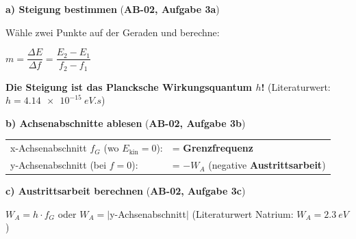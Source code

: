 \documentclass[11pt,a4paper]{article}
\begin{document}

\begin{tcolorbox}[schrittbox={Schritt 3: Auswertung (15 min)}]
\textbf{a) Steigung bestimmen} (\textbf{AB-02, Aufgabe 3a})

Wähle zwei Punkte auf der Geraden und berechne:
\begin{center}
$m = \dfrac{\Delta E}{\Delta f} = \dfrac{E_2 - E_1}{f_2 - f_1}$
\end{center}

\textbf{Die Steigung ist das Plancksche Wirkungsquantum $h$!} (Literaturwert: $h = \SI{4,14e-15}{eV.s}$)

\vspace{0.4em}
\textbf{b) Achsenabschnitte ablesen} (\textbf{AB-02, Aufgabe 3b})

\begin{tabular}{@{}p{7cm}l@{}}
x-Achsenabschnitt $f_G$ (wo $E_{\text{kin}} = 0$): & = \textbf{Grenzfrequenz} \\
y-Achsenabschnitt (bei $f = 0$): & = $-W_A$ (negative \textbf{Austrittsarbeit})
\end{tabular}

\vspace{0.4em}
\textbf{c) Austrittsarbeit berechnen} (\textbf{AB-02, Aufgabe 3c})

$W_A = h \cdot f_G$ \quad oder \quad $W_A = |$y-Achsenabschnitt$|$ \quad (Literaturwert Natrium: $W_A = \SI{2,3}{eV}$)
\end{tcolorbox}

\vspace{0.5em}

\end{document}
